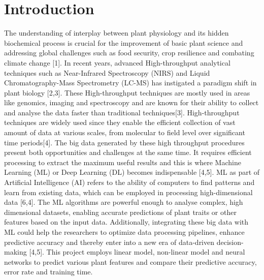 \documentclass[12pt,a4paper]{report}
\begin{document}
\chapter{Introduction}
The understanding of interplay between plant physiology and its hidden biochemical process is crucial for the improvement of basic plant science and addressing global challenges such as food security, crop resilience and combating climate change [1]. 
In recent years, advanced High-throughput analytical techniques such as Near-Infrared Spectroscopy (NIRS) and Liquid Chromatography-Mass Spectrometry (LC-MS) has instigated a paradigm shift in plant biology [2,3].
These High-throughput techniques are mostly used in areas like genomics, imaging and spectroscopy and are known for their ability to collect and analyse the data faster than traditional techniques[3].
High-throughput techniques are widely used since they enable the efficient collection of vast amount of data at various scales, from molecular to field level over significant time periods[4].
The big data generated by these high throughput procedures present both opportunities and challenges at the same time. It requires efficient processing to extract the maximum useful results and this is where Machine Learning (ML) or Deep Learning (DL) becomes indispensable [4,5].
ML as part of Artificial Intelligence (AI) refers to the ability of computers to find patterns and learn from existing data, which can be employed in processing high-dimensional data [6,4]. The ML algorithms are powerful enough to analyse complex, high dimensional datasets, 
enabling accurate predictions of plant traits or other features based on the input data. Additionally, integrating these big data with ML could help the researchers to optimize data processing pipelines, enhance predictive accuracy and thereby enter into a new era of data-driven decision-making [4,5]. This project employs linear model, non-linear model and neural networks to predict various plant features and compare their predictive accuracy, error rate and training time. \\
\end{document}

